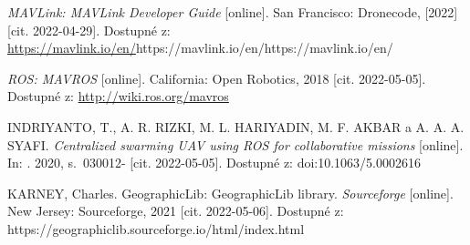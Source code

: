 \begin{thebibliography}{99}
\textit{MAVLink: MAVLink Developer Guide} [online]. San Francisco: Dronecode, [2022] [cit. 2022-04-29]. Dostupné z: \href{https://mavlink.io/en/}{https://mavlink.io/en/}{https://mavlink.io/en/}{https://mavlink.io/en/}

\textit{ROS: MAVROS} [online]. California: Open Robotics, 2018 [cit. 2022-05-05]. Dostupné z: \href{http://wiki.ros.org/mavros}{http://wiki.ros.org/mavros}

INDRIYANTO, T., A. R. RIZKI, M. L. HARIYADIN, M. F. AKBAR a A. A. A. SYAFI. \textit{Centralized swarming UAV using ROS for collaborative missions} [online]. In: . 2020, s.~030012- [cit. 2022-05-05]. Dostupné z: doi:10.1063/5.0002616

KARNEY, Charles. GeographicLib: GeographicLib library. \textit{Sourceforge} [online]. New Jersey: Sourceforge, 2021 [cit. 2022-05-06]. Dostupné z: https://geographiclib.sourceforge.io/html/index.html










\end{thebibliography}
